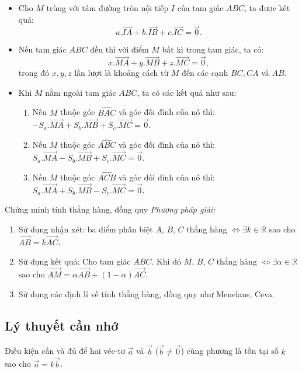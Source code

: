 \begin{bt}
\begin{itemize}
\item Cho $M$ trùng với tâm đường tròn nội tiếp $I$ của tam giác $ABC$, ta được kết quả:\\ \[a.\vec {IA}  +  b.\vec {IB}  +  c.\vec {IC}=\vec {0}.\]
\item Nếu tam giác $ABC$ đều thì với điểm $M$ bất kì trong tam giác, ta có:
\[x.\vec {MA}  +  y.\vec {MB}  +  z.\vec {MC}=\vec {0},\]
trong đó $x,y,z$ lần lượt là khoảng cách từ $M$ đến các cạnh $BC,CA$ và $AB$.
\item Khi $M$ nằm ngoài tam giác $ABC$, ta có các kết quả như sau:
\begin{enumerate}[-]
\item Nếu $M$ thuộc góc $\widehat{BAC}$ và góc đối đỉnh của nó thì: $  -  S_a.\vec {MA}  +  S_b.\vec {MB}  +  S_c.\vec {MC}=\vec {0}$.
\item Nếu $M$ thuộc góc $\widehat{ABC}$ và góc đối đỉnh của nó thì: $S_a.\vec {MA}  -  S_b.\vec {MB}  +  S_c.\vec {MC}=\vec {0}$.
\item Nếu $M$ thuộc góc $\widehat{ACB}$ và góc đối đỉnh của nó thì: $S_a.\vec {MA}  +  S_b.\vec {MB}  -  S_c.\vec {MC}=\vec {0}$.
\end{enumerate}
\end{itemize}
\end{bt}

\begin{dang}%
{Chứng minh tính thẳng hàng, đồng quy}
\textit{Phương pháp giải:}
\begin{enumerate}
\item Sử dụng nhận xét: ba điểm phân biệt $A$, $B$, $C$ thẳng hàng $\Leftrightarrow \exists k\in\mathbb{R}$ sao cho $\vec{AB}=k\vec{AC}$.
\item Sử dụng kết quả: Cho tam giác $ABC$. Khi đó $M$, $B$, $C$ thẳng hàng $\Leftrightarrow \exists \alpha\in\mathbb{R}$ sao cho $\vec{AM}=\alpha \vec{AB}+ (1-\alpha)\vec{AC}$.
\item Sử dụng các định lí về tính thẳng hàng, đồng quy như Menelaus, Ceva.
\end{enumerate}
\end{dang}

\subsection*{Lý thuyết cần nhớ}
\begin{dl}
Điều kiện cần và đủ để hai véc-tơ $\vec{a}$ và $\vec{b}$ ($\vec{b} \ne \vec{0}$) cùng phương là tồn tại số $k$ sao cho $\vec{a}=k\vec{b}$.
\end{dl}


